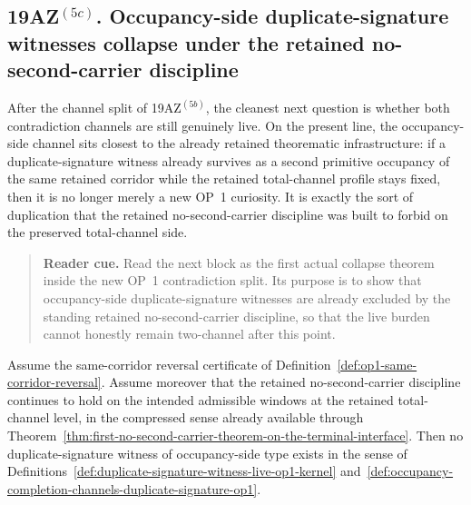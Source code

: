 \subsection*{19AZ$^{(5c)}$. Occupancy-side duplicate-signature witnesses collapse under the retained no-second-carrier discipline}
\label{sec:occupancy-side-duplicate-signature-witnesses-collapse-no-second-carrier}
After the channel split of 19AZ$^{(5b)}$, the cleanest next question is whether both contradiction channels are still genuinely live. On the present line, the occupancy-side channel sits closest to the already retained theorematic infrastructure: if a duplicate-signature witness already survives as a second primitive occupancy of the same retained corridor while the retained total-channel profile stays fixed, then it is no longer merely a new OP~1 curiosity. It is exactly the sort of duplication that the retained no-second-carrier discipline was built to forbid on the preserved total-channel side.

\begin{quote}\small
\noindent\textbf{Reader cue.} Read the next block as the first actual collapse theorem inside the new OP~1 contradiction split. Its purpose is to show that occupancy-side duplicate-signature witnesses are already excluded by the standing retained no-second-carrier discipline, so that the live burden cannot honestly remain two-channel after this point.
\end{quote}

\begin{proposition}
\label{prop:occupancy-side-duplicate-signature-witnesses-excluded-retained-op1-corridor}
Assume the same-corridor reversal certificate of Definition~\ref{def:op1-same-corridor-reversal}. Assume moreover that the retained no-second-carrier discipline continues to hold on the intended admissible windows at the retained total-channel level, in the compressed sense already available through Theorem~\ref{thm:first-no-second-carrier-theorem-on-the-terminal-interface}. Then no duplicate-signature witness of occupancy-side type exists in the sense of Definitions~\ref{def:duplicate-signature-witness-live-op1-kernel} and~\ref{def:occupancy-completion-channels-duplicate-signature-op1}.
\end{proposition}

